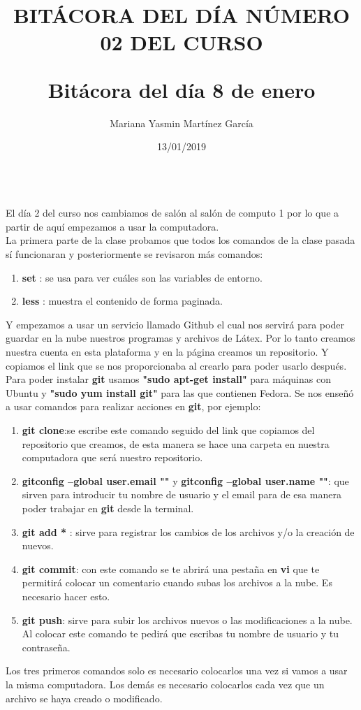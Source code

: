 \documentclass[letterpaper, 12pt, twoside]{article}
\title{\Huge\item\color{red}\textbf {BITÁCORA DEL DÍA NÚMERO 02 DEL CURSO}}
\author{Mariana Yasmin Martínez García}
\date{13/01/2019}
\begin{document}
	\maketitle
	
	\newpage
	\title{\huge\textbf{Bitácora del día 8 de enero\\}} \\
	El día 2 del curso nos cambiamos de salón al salón de computo 1 por lo que a partir de aquí empezamos a usar la computadora. \\
	La primera parte de la clase probamos que todos los comandos de la clase pasada sí funcionaran y posteriormente se revisaron más comandos:
	\begin{enumerate}
		\item \textbf{\large set }: se usa para ver cuáles son las variables de entorno.
		\item \textbf{\large less }: muestra el contenido de forma paginada.
		
	\end{enumerate}
    Y empezamos a usar un servicio llamado Github el cual nos servirá para poder guardar en la nube nuestros programas y archivos de Látex.
    Por lo tanto creamos nuestra cuenta en esta plataforma y en la página creamos un repositorio. Y copiamos el link que se nos proporcionaba al crearlo para poder usarlo después. \\
    Para poder instalar \textbf{git} usamos \textbf{"sudo apt-get install"} para máquinas con Ubuntu y \textbf{"sudo yum install git"} para las que contienen Fedora. Se nos enseñó a usar comandos para realizar acciones en \textbf{git}, por ejemplo:
    \begin{enumerate}
    	\item\textbf{\large git clone}:se escribe este comando seguido del link que copiamos del repositorio que creamos, de esta manera se hace una carpeta en nuestra computadora que será nuestro repositorio. 
    	\item\textbf{\large gitconfig --global user.email ""} y \textbf{ \large gitconfig --global user.name ""}: que sirven para introducir tu nombre de usuario y el email para de esa manera poder trabajar en \textbf{git} desde la terminal. \\
    	\item\textbf{\large git add * }: sirve para registrar los cambios de los archivos y/o la creación de nuevos.
    	\item\textbf{\large git commit}: con este comando se te abrirá una pestaña en \textbf{vi} que te permitirá colocar un comentario cuando subas los archivos a la nube. Es necesario hacer esto.
    	\item\textbf{\large git push}: sirve para subir los archivos nuevos o las modificaciones a la nube. Al colocar este comando te pedirá que escribas tu nombre de usuario y tu contraseña.
    \end{enumerate}
 Los tres primeros comandos solo es necesario colocarlos una vez si vamos a usar la misma computadora. Los demás es necesario colocarlos cada vez que un archivo se haya creado o modificado.
\end{document}
